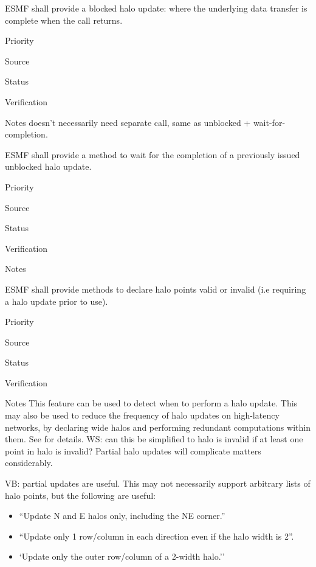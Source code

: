 
ESMF shall provide a blocked halo update: where the underlying
data transfer is complete when the call returns.

\begin{reqlist}
\item[Priority]
\item[Source]
\item[Status]
\item[Verification]
\item[Notes] doesn't necessarily need separate call, same as unblocked
  + wait-for-completion.
\end{reqlist}


ESMF shall provide a method to wait for the completion of a previously
issued unblocked halo update.

\begin{reqlist}
\item[Priority]
\item[Source]
\item[Status]
\item[Verification]
\item[Notes]
\end{reqlist}


ESMF shall provide methods to declare halo points valid or invalid
(i.e requiring a halo update prior to use).

\begin{reqlist}
\item[Priority]
\item[Source]
\item[Status]
\item[Verification]
\item[Notes] This feature can be used to detect when to perform a halo
  update. This may also be used to reduce the frequency of halo
  updates on high-latency networks, by declaring wide halos and
  performing redundant computations within them. See \cite{ref:b2001}
  for details.  WS:  can this be simplified to halo is invalid
  if at least one point in halo is invalid?  Partial halo updates
  will complicate matters considerably.

  VB: partial updates are useful. This may not necessarily support
  arbitrary lists of halo points, but the following are useful:
  \begin{itemize}
  \item ``Update N and E halos only, including the NE corner.''
  \item ``Update only 1 row/column in each direction even if the halo
    width is 2''.
  \item `Update only the outer row/column of a 2-width halo.''
  \end{itemize}
\end{reqlist}

